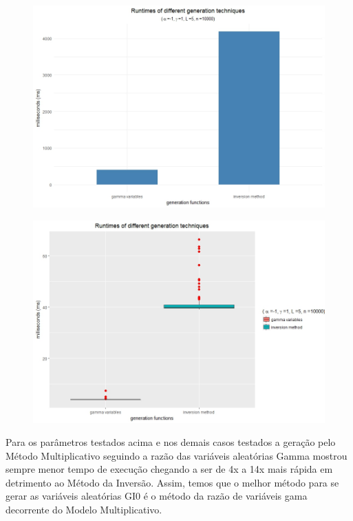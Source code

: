 \documentclass[12pt,letterpaper]{article}
\begin{document}
\begin{figure}[H]
	\begin{center}
		\includegraphics[width=0.95\columnwidth]{bar_L5}
	\end{center}
\end{figure}

\begin{figure}[H]
	\begin{center}
		\includegraphics[width=0.95\columnwidth]{box_L5}
	\end{center}
\end{figure}

Para os parâmetros testados acima e nos demais casos testados a geração pelo Método Multiplicativo seguindo a razão das variáveis aleatórias Gamma mostrou sempre menor tempo de execução chegando a ser de 4x a 14x mais rápida em detrimento ao Método da Inversão. Assim, temos que o melhor método para se gerar as variáveis aleatórias GI0 é o método da razão de variáveis gama decorrente do Modelo Multiplicativo.
\end{document}
